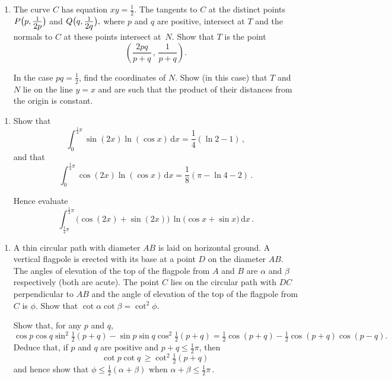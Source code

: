 \documentclass[a4, 11pt]{report}
\newlength{\qspace}
\newcounter{qnumber}
\newenvironment{question}%
 {\vspace{\qspace}
  \begin{enumerate}[\bfseries 1\quad][10]%
    \setcounter{enumi}{\value{qnumber}}%
    \item%
 }
{
  \end{enumerate}
  \filbreak
  \stepcounter{qnumber}
 }
\def\d{{\mathrm d}}
\def\le{\leqslant}
\def\ge{\geqslant}
\begin{document}
\begin{question}
The curve $C$ has equation $xy = \frac12$.
The tangents to $C$ at the distinct
points 
$
P\big(p, 
\frac1 
{
\rule[0pt]{0pt}{2.7mm}
\mbox{\fontsize{10pt}{13}\selectfont$2p$}
}
\big)
$
and
$
Q\big(q, 
\frac1 
{
\rule[0pt]{0pt}{2.7mm}
\mbox{\fontsize{10pt}{13}\selectfont$2q$}
}
\big),
$
where $p$ and $q$ are positive,
intersect at $T$ and the normals to $C$
 at these points intersect at~$N$. Show that 
 $T$ is the point 
\[
\left( \frac{2pq}{p+q}\,,\, \frac 1 {p+q}\right)\!.
\] 

In the case $pq=\frac12$, find the coordinates of $N$. Show (in this case)
that
$T$ and $N$ lie on the line $y=x$ and are such that the 
product of their distances from the origin is constant.
\end{question}

\begin{question}
 Show that 
\[
\int_0^{\frac14\pi} \sin (2x) \ln(\cos x)\, \d x = \frac14(\ln 2 -1)\,,
\]
and that 
\[
\int_0^{\frac14\pi} \cos (2x) \ln(\cos x)\, \d x = \frac18(\pi -\ln 4-2)\,.
\]

Hence evaluate
\[
\int_{\frac14\pi}^{\frac12\pi}
 \big ( \cos(2x) + \sin (2x)\big) \, \ln \big( \cos x + \sin x\big)\, \d x\,.
\]
	\end{question}
	
\begin{question}
A thin circular path with diameter $AB$ is laid on horizontal ground.
A vertical flagpole is erected with its base at a point $D$
on the diameter $AB$. The angles of 
elevation of the top of the flagpole from $A$ and $B$ are $\alpha$ and
$\beta$ respectively (both are acute). 
The point $C$ lies on the circular path  
with $DC$ perpendicular to $AB$ and the angle of elevation of the top of the
flagpole from $C$ is $\phi$. Show that $\cot\alpha\cot \beta  = \cot^2\phi$.


Show that, for any $p$ and $q$,
\[
\cos p \cos q \sin^2\tfrac12(p+q) 
- \sin p\sin q \cos^2 \tfrac12 (p+q) = 
\tfrac12 \cos(p+q) -\tfrac12 \cos(p+q)\cos(p-q)
.\]
Deduce that, if $p$ and $q$ are positive and  $ p+q  \le \tfrac12 \pi$,
then
\[
 \cot p\cot q\,
\ge \cot^2 \tfrac12(p+q) \,
\]
and hence show 
that $\phi \le \tfrac12(\alpha+\beta)$ 
when $ \alpha +\beta \le \tfrac12 \pi\,$.
\end{question}
	
\end{document}
